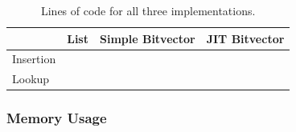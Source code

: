 \documentclass[a4paper,
		12pt,
		parskip=full,
		titlepage
		]{scrartcl}
\begin{document}
\begin{table}
  \centering
  \begin{tabularx}{\textwidth}{l|XXX}
  &List&Simple Bitvector&JIT Bitvector\\
  \hline
  Insertion&&&\\
  Lookup&&&\\
  \end{tabularx}
  \caption{Lines of code for all three implementations.}
  \label{table:loc}
\end{table}

\subsubsection{Memory Usage}
\newpage
{}


\end{document}
